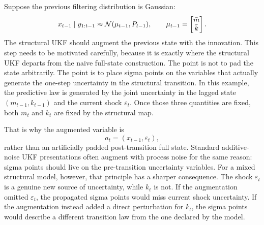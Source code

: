 Suppose the previous filtering distribution is Gaussian:
\begin{equation}
  x_{t-1}\mid y_{1:t-1}
  \approx \mathcal{N}(\mu_{t-1},P_{t-1}),
  \qquad
  \mu_{t-1}=
  \begin{bmatrix}\bar m\\ \bar k\end{bmatrix}.
\end{equation}
The structural UKF should augment the previous state with the innovation.  This
step needs to be motivated carefully, because it is exactly where the structural
UKF departs from the naive full-state construction.  The point is not to pad the
state arbitrarily.  The point is to place sigma points on the variables that
actually generate the one-step uncertainty in the structural transition.  In
this example, the predictive law is generated by the joint uncertainty in the
lagged state $(m_{t-1},k_{t-1})$ and the current shock $\varepsilon_t$.  Once
those three quantities are fixed, both $m_t$ and $k_t$ are fixed by the
structural map.

That is why the augmented variable is
\begin{equation}
  a_t=(x_{t-1},\varepsilon_t),
  \label{eq:bf-ukf-augmented-variable}
\end{equation}
rather than an artificially padded post-transition full state.  Standard
additive-noise UKF presentations often augment with process noise for the same
reason: sigma points should live on the pre-transition uncertainty variables.
For a mixed structural model, however, that principle has a sharper consequence.
The shock $\varepsilon_t$ is a genuine new source of uncertainty, while $k_t$
is not.  If the augmentation omitted $\varepsilon_t$, the propagated sigma
points would miss current shock uncertainty.  If the augmentation instead added
a direct perturbation for $k_t$, the sigma points would describe a different
transition law from the one declared by the model.


